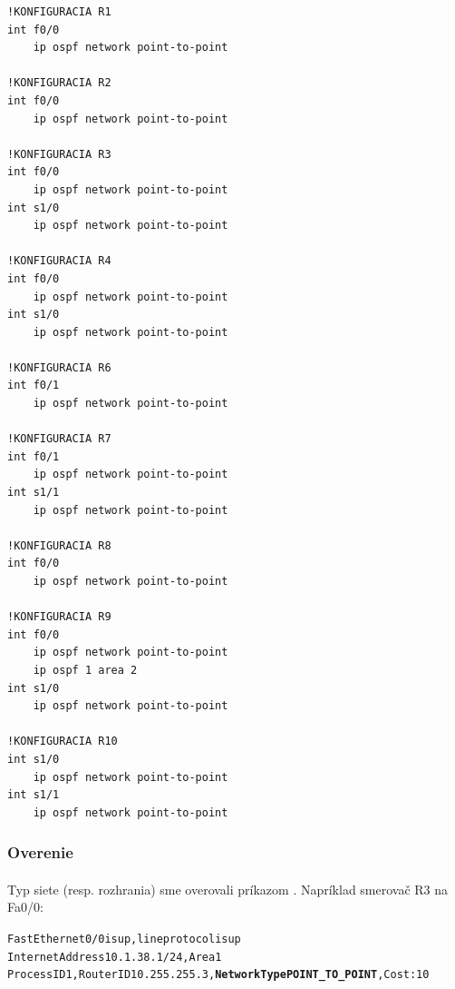 \documentclass[12pt,twoside,a4paper]{report}
\begin{document}
\noindent
{\selectfont

\begin{small}

\begin{verbatim}
!KONFIGURACIA R1
int f0/0
    ip ospf network point-to-point

!KONFIGURACIA R2
int f0/0
    ip ospf network point-to-point

!KONFIGURACIA R3
int f0/0
    ip ospf network point-to-point
int s1/0
    ip ospf network point-to-point

!KONFIGURACIA R4
int f0/0
    ip ospf network point-to-point
int s1/0
    ip ospf network point-to-point

!KONFIGURACIA R6
int f0/1
    ip ospf network point-to-point

!KONFIGURACIA R7
int f0/1
    ip ospf network point-to-point
int s1/1
    ip ospf network point-to-point

!KONFIGURACIA R8
int f0/0
    ip ospf network point-to-point

!KONFIGURACIA R9
int f0/0
    ip ospf network point-to-point
    ip ospf 1 area 2
int s1/0
    ip ospf network point-to-point

!KONFIGURACIA R10
int s1/0
    ip ospf network point-to-point
int s1/1
    ip ospf network point-to-point
\end{verbatim}

\end{small}

}

\subsubsection{Overenie}
\paragraph{}
Typ siete (resp. rozhrania) sme overovali príkazom . Napríklad smerovač R3 na Fa0/0:

\noindent
{\selectfont
\begin{small}
\begin{alltt}
FastEthernet0/0 is up, line protocol is up 
  Internet Address 10.1.38.1/24, Area 1 
  Process ID 1, Router ID 10.255.255.3, \textbf{Network Type POINT_TO_POINT}, Cost: 10
\end{alltt}
\end{small}
}
\end{document}
